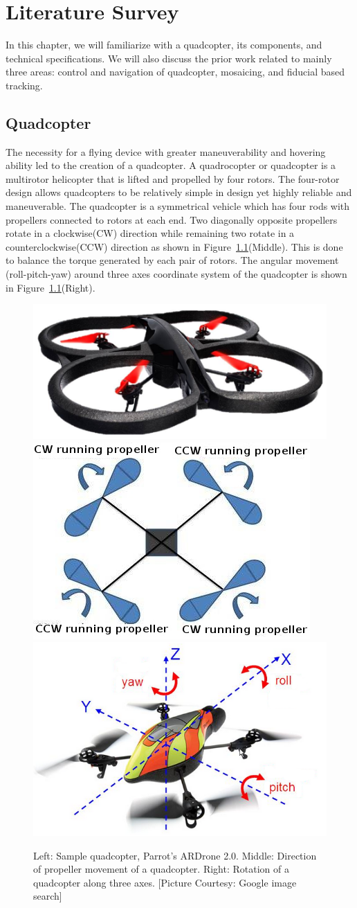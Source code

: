 \chapter{Literature Survey}
\label{ch:quadcopter}
In this chapter, we will familiarize with a quadcopter, its components, and
technical specifications. We will also discuss the prior work related to
mainly three areas: control and navigation of quadcopter, mosaicing, and
fiducial based tracking. 
\section{Quadcopter}
The necessity for a flying device with greater maneuverability and hovering
ability led to the creation of a quadcopter. A quadrocopter or quadcopter  is a
multirotor helicopter that is lifted and propelled by four rotors. The
four-rotor design allows quadcopters to be relatively simple in design yet
highly reliable and maneuverable. The quadcopter  is a  symmetrical vehicle which
has four rods with propellers connected to rotors  at each end. Two diagonally
opposite propellers rotate in a clockwise(CW) direction while remaining  two
rotate in a counterclockwise(CCW) direction as shown in
Figure~\ref{fig:quadcopter}(Middle). This is done to balance the
torque generated by each pair of rotors. The angular movement (roll-pitch-yaw)
around three axes coordinate system of the quadcopter is shown in
Figure~\ref{fig:quadcopter}(Right).


\begin{figure}[b!]
  \includegraphics[width=0.3\linewidth]{images/ardrone2}	
  \includegraphics[width=0.34\linewidth]{images/quadrotor}
  \includegraphics[width=0.34\linewidth]{images/rpy}
  \caption[Quadcopter Motions]{Left: Sample quadcopter, Parrot's ARDrone 2.0.
  Middle: Direction of propeller movement of a quadcopter. Right: Rotation of
  a quadcopter along three axes. [Picture Courtesy: Google image search]}
  \label{fig:quadcopter}
\end{figure}

